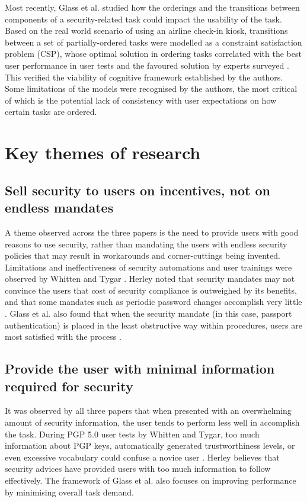 \documentclass[11pt]{article}
\begin{document}
Most recently, Glass et al. \cite{glass2016usability} studied how the orderings and the transitions between components of a security-related task could impact the usability of the task. Based on the real world scenario of using an airline check-in kiosk, transitions between a set of partially-ordered tasks were modelled as a constraint satisfaction problem (CSP), whose optimal solution in ordering tasks correlated with the best user performance in user tests and the favoured solution by experts surveyed \cite[Fig. 7]{glass2016usability}. This verified the viability of cognitive framework established by the authors. Some limitations of the models were recognised by the authors, the most critical of which is the potential lack of consistency with user expectations on how certain tasks are ordered.

\section{Key themes of research}

\subsection{Sell security to users on incentives, not on endless mandates}

A theme observed across the three papers is the need to provide users with good reasons to use security, rather than mandating the users with endless security policies that may result in workarounds and corner-cuttings being invented. Limitations and ineffectiveness of security automations and user trainings were observed by Whitten and Tygar \cite[Sec. 1]{whitten1999johnny}. Herley noted that security mandates may not convince the users that cost of  security compliance is outweighed by its benefits, and that some mandates such as periodic password changes accomplish very little \cite[1.3, 2.2]{herley2014more}. Glass et al. also found that when the security mandate (in this case, passport authentication) is placed in the least obstructive way within procedures, users are most satisfied with the process \cite[Sec. VII]{glass2016usability}.

\subsection{Provide the user with minimal information required for security}

It was observed by all three papers that when presented with an overwhelming amount of security information, the user tends to perform less well in accomplish the task. During PGP 5.0 user tests by Whitten and Tygar, too much information about PGP keys, automatically generated trustworthiness levels, or even excessive vocabulary could confuse a novice user \cite[4.6, 4.7]{whitten1999johnny}. Herley \cite[2.1]{herley2014more} believes that security advices have provided users with too much information to follow effectively. The framework of Glass et al. \cite[III. D.]{glass2016usability} also focuses on improving performance by minimising overall task demand.
\end{document}
